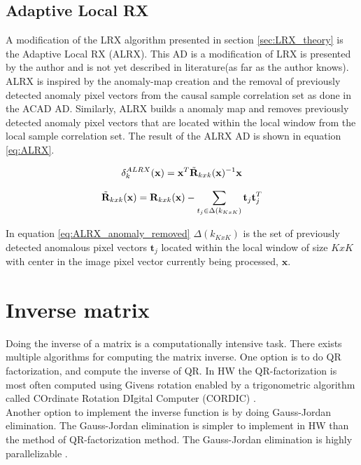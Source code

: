 \subsection{Adaptive Local RX}
\label{sec:Adaptive_LRX_theory}
A modification of the LRX algorithm presented in section \ref{sec:LRX_theory} is the Adaptive Local RX (ALRX). This AD is a modification of LRX is presented by the author and is not yet described in literature(as far as the author knows). 
\\

ALRX is inspired by the anomaly-map creation and the removal of previously detected anomaly pixel vectors from the causal sample correlation set as done in the ACAD AD. Similarly, ALRX builds a anomaly map and removes previously detected anomaly pixel vectors that are located within the local window from the local sample correlation set. The result of the ALRX AD is shown in equation \ref{eq:ALRX}. 

\begin{equation}
    \delta_k^{ALRX}(\textbf{x}) = \textbf{x}^T\Tilde{\textbf{R}}_{k x k}(\textbf{x})^{-1}\textbf{x}
    \label{eq:ALRX}
\end{equation}


\begin{equation}
   \Tilde{\textbf{R}}_{k x k}(\textbf{x})= \textbf{R}_{k x k}(\textbf{x})-\sum_{t_j\in\Delta(k_{KxK})}\textbf{t}_j\textbf{t}_j^T
    \label{eq:ALRX_anomaly_removed}
\end{equation}

In equation \ref{eq:ALRX_anomaly_removed} $\Delta(k_{KxK})$ is the set of previously detected anomalous pixel vectors $\textbf{t}_j$ located within the local window of size $KxK$ with center in the image pixel vector currently being processed, $\textbf{x}$.

\section{Inverse matrix}
Doing the inverse of a matrix is a computationally intensive task. There exists multiple algorithms for computing the matrix inverse. One option is to do QR factorization\cite{QRD_fpga}, and compute the inverse of QR. In HW the QR-factorization is most often computed using Givens rotation enabled by a trigonometric algorithm called COrdinate Rotation DIgital Computer (CORDIC) \cite{CORDIC}. \\

Another option to implement the inverse function is by doing Gauss-Jordan elimination. The Gauss-Jordan elimination is simpler to implement in HW than the method of QR-factorization method. The Gauss-Jordan elimination is highly parallelizable \cite{gauss_jordan_fpga}. 

